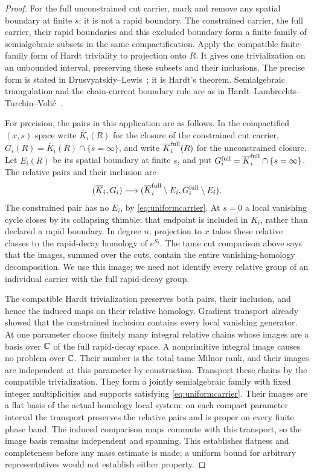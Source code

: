 \begin{proof}
For the full unconstrained cut carrier, mark and remove any
spatial boundary at finite $s$; it is not a rapid boundary.
The constrained carrier, the full carrier, their rapid boundaries
and this excluded boundary form a finite family of semialgebraic
subsets in the same compactification. Apply the compatible
finite-family form of Hardt triviality to projection onto $R$.
It gives one trivialization on an unbounded interval, preserving
these subsets and their inclusions. The precise form is stated
in Drusvyatskiy--Lewis~\cite[Theorem~2.25]{DrusvyatskiyLewis};
it is Hardt's theorem. Semialgebraic triangulation and the
chain-current boundary rule are as in
Hardt--Lambrechts--Turchin--Voli\'c~\cite[Sections~2.1 and~3,
especially Theorem~3.5]{HLTV}.

For precision, the pairs in this application are as follows. In the
compactified $(x,s)$ space write $\overline K_i(R)$ for the closure of
the constrained cut carrier, $G_i(R)=\overline K_i(R)\cap\{s=\infty\}$,
and write $\overline K_i^{\rm full}(R)$ for the unconstrained closure.
Let $E_i(R)$ be its spatial boundary at finite $s$, and put
$G_i^{\rm full}=\overline K_i^{\rm full}\cap\{s=\infty\}$. The
relative pairs and their inclusion are
\[
 (\overline K_i,G_i)\longrightarrow
 (\overline K_i^{\rm full}\setminus E_i,
       G_i^{\rm full}\setminus E_i).
\]
The constrained pair has no $E_i$, by \eqref{eq:uniformcarrier}.
At $s=0$ a local vanishing cycle closes by its collapsing thimble;
that endpoint is included in $K_i$, rather than declared a rapid
boundary. In degree $n$, projection to $x$ takes these relative
classes to the rapid-decay homology of $e^{S_t}$. The tame cut
comparison above says that the images, summed over the cuts, contain
the entire vanishing-homology decomposition. We use this image;
we need not identify every relative group of an individual carrier
with the full rapid-decay group.

The compatible Hardt trivialization preserves both pairs, their
inclusion, and hence the induced maps on their relative homology.
Gradient transport already showed that the constrained inclusion
contains every local vanishing generator. At one parameter choose
finitely many integral relative chains whose images are a basis
over $\mathbb C$ of the full rapid-decay space. A nonprimitive integral
image causes no problem over $\mathbb C$. Their number is the total tame Milnor rank, and their images are
independent at this parameter by construction. Transport these chains by
the compatible trivialization. They form a jointly semialgebraic
family with fixed integer multiplicities and supports satisfying
\eqref{eq:uniformcarrier}. Their images are a flat basis of the
actual homology local system: on each compact parameter interval
the transport preserves the relative pairs and is proper on
every finite phase band. The induced comparison maps commute with this transport, so the image
basis remains independent and spanning. This establishes flatness and
completeness before any mass estimate is made; a uniform bound for
arbitrary representatives would not establish either property.


\end{proof}
